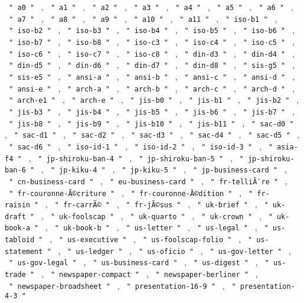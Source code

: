 \texttt{\ "\ a0\ "\ } , \texttt{\ "\ a1\ "\ } , \texttt{\ "\ a2\ "\ } ,
\texttt{\ "\ a3\ "\ } , \texttt{\ "\ a4\ "\ } , \texttt{\ "\ a5\ "\ } ,
\texttt{\ "\ a6\ "\ } , \texttt{\ "\ a7\ "\ } , \texttt{\ "\ a8\ "\ } ,
\texttt{\ "\ a9\ "\ } , \texttt{\ "\ a10\ "\ } , \texttt{\ "\ a11\ "\ }
, \texttt{\ "\ iso-b1\ "\ } , \texttt{\ "\ iso-b2\ "\ } ,
\texttt{\ "\ iso-b3\ "\ } , \texttt{\ "\ iso-b4\ "\ } ,
\texttt{\ "\ iso-b5\ "\ } , \texttt{\ "\ iso-b6\ "\ } ,
\texttt{\ "\ iso-b7\ "\ } , \texttt{\ "\ iso-b8\ "\ } ,
\texttt{\ "\ iso-c3\ "\ } , \texttt{\ "\ iso-c4\ "\ } ,
\texttt{\ "\ iso-c5\ "\ } , \texttt{\ "\ iso-c6\ "\ } ,
\texttt{\ "\ iso-c7\ "\ } , \texttt{\ "\ iso-c8\ "\ } ,
\texttt{\ "\ din-d3\ "\ } , \texttt{\ "\ din-d4\ "\ } ,
\texttt{\ "\ din-d5\ "\ } , \texttt{\ "\ din-d6\ "\ } ,
\texttt{\ "\ din-d7\ "\ } , \texttt{\ "\ din-d8\ "\ } ,
\texttt{\ "\ sis-g5\ "\ } , \texttt{\ "\ sis-e5\ "\ } ,
\texttt{\ "\ ansi-a\ "\ } , \texttt{\ "\ ansi-b\ "\ } ,
\texttt{\ "\ ansi-c\ "\ } , \texttt{\ "\ ansi-d\ "\ } ,
\texttt{\ "\ ansi-e\ "\ } , \texttt{\ "\ arch-a\ "\ } ,
\texttt{\ "\ arch-b\ "\ } , \texttt{\ "\ arch-c\ "\ } ,
\texttt{\ "\ arch-d\ "\ } , \texttt{\ "\ arch-e1\ "\ } ,
\texttt{\ "\ arch-e\ "\ } , \texttt{\ "\ jis-b0\ "\ } ,
\texttt{\ "\ jis-b1\ "\ } , \texttt{\ "\ jis-b2\ "\ } ,
\texttt{\ "\ jis-b3\ "\ } , \texttt{\ "\ jis-b4\ "\ } ,
\texttt{\ "\ jis-b5\ "\ } , \texttt{\ "\ jis-b6\ "\ } ,
\texttt{\ "\ jis-b7\ "\ } , \texttt{\ "\ jis-b8\ "\ } ,
\texttt{\ "\ jis-b9\ "\ } , \texttt{\ "\ jis-b10\ "\ } ,
\texttt{\ "\ jis-b11\ "\ } , \texttt{\ "\ sac-d0\ "\ } ,
\texttt{\ "\ sac-d1\ "\ } , \texttt{\ "\ sac-d2\ "\ } ,
\texttt{\ "\ sac-d3\ "\ } , \texttt{\ "\ sac-d4\ "\ } ,
\texttt{\ "\ sac-d5\ "\ } , \texttt{\ "\ sac-d6\ "\ } ,
\texttt{\ "\ iso-id-1\ "\ } , \texttt{\ "\ iso-id-2\ "\ } ,
\texttt{\ "\ iso-id-3\ "\ } , \texttt{\ "\ asia-f4\ "\ } ,
\texttt{\ "\ jp-shiroku-ban-4\ "\ } ,
\texttt{\ "\ jp-shiroku-ban-5\ "\ } ,
\texttt{\ "\ jp-shiroku-ban-6\ "\ } , \texttt{\ "\ jp-kiku-4\ "\ } ,
\texttt{\ "\ jp-kiku-5\ "\ } , \texttt{\ "\ jp-business-card\ "\ } ,
\texttt{\ "\ cn-business-card\ "\ } ,
\texttt{\ "\ eu-business-card\ "\ } , \texttt{\ "\ fr-telliÃ¨re\ "\ } ,
\texttt{\ "\ fr-couronne-Ã©criture\ "\ } ,
\texttt{\ "\ fr-couronne-Ã©dition\ "\ } , \texttt{\ "\ fr-raisin\ "\ } ,
\texttt{\ "\ fr-carrÃ©\ "\ } , \texttt{\ "\ fr-jÃ©sus\ "\ } ,
\texttt{\ "\ uk-brief\ "\ } , \texttt{\ "\ uk-draft\ "\ } ,
\texttt{\ "\ uk-foolscap\ "\ } , \texttt{\ "\ uk-quarto\ "\ } ,
\texttt{\ "\ uk-crown\ "\ } , \texttt{\ "\ uk-book-a\ "\ } ,
\texttt{\ "\ uk-book-b\ "\ } , \texttt{\ "\ us-letter\ "\ } ,
\texttt{\ "\ us-legal\ "\ } , \texttt{\ "\ us-tabloid\ "\ } ,
\texttt{\ "\ us-executive\ "\ } , \texttt{\ "\ us-foolscap-folio\ "\ } ,
\texttt{\ "\ us-statement\ "\ } , \texttt{\ "\ us-ledger\ "\ } ,
\texttt{\ "\ us-oficio\ "\ } , \texttt{\ "\ us-gov-letter\ "\ } ,
\texttt{\ "\ us-gov-legal\ "\ } , \texttt{\ "\ us-business-card\ "\ } ,
\texttt{\ "\ us-digest\ "\ } , \texttt{\ "\ us-trade\ "\ } ,
\texttt{\ "\ newspaper-compact\ "\ } ,
\texttt{\ "\ newspaper-berliner\ "\ } ,
\texttt{\ "\ newspaper-broadsheet\ "\ } ,
\texttt{\ "\ presentation-16-9\ "\ } ,
\texttt{\ "\ presentation-4-3\ "\ }


